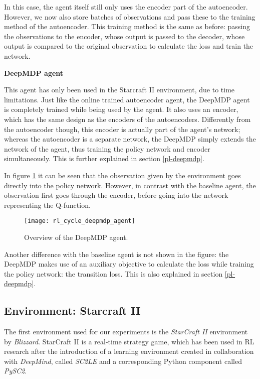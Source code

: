 In this case, the agent itself still only uses the encoder part of the autoencoder. However, we now also store batches of observations and pass these to the training method of the autoencoder. This training method is the same as before: passing the observations to the encoder, whose output is passed to the decoder, whose output is compared to the original observation to calculate the loss and train the network.\newline\par

\noindent \textbf{DeepMDP agent} \par
\noindent This agent has only been used in the Starcraft II environment, due to time limitations. Just like the online trained autoencoder agent, the DeepMDP agent is completely trained while being used by the agent. It also uses an encoder, which has the same design as the encoders of the autoencoders. Differently from the autoencoder though, this encoder is actually part of the agent's network; whereas the autoencoder is a separate network, the DeepMDP simply extends the network of the agent, thus training the policy network and encoder simultaneously. This is further explained in section \ref{pl-deepmdp}.

In figure \ref{fig:rl_cycle_deepmdp} it can be seen that the observation given by the environment goes directly into the policy network. However, in contrast with the baseline agent, the observation first goes through the encoder, before going into the network representing the Q-function.

\begin{figure}[h]
    \centering
    \texttt{[image: rl\_cycle\_deepmdp\_agent]}
    \caption{Overview of the DeepMDP agent.}
    \label{fig:rl_cycle_deepmdp}
\end{figure}

Another difference with the baseline agent is not shown in the figure: the DeepMDP makes use of an auxiliary objective to calculate the loss while training the policy network: the transition loss. This is also explained in section \ref{pl-deepmdp}.

\subsection{Environment: Starcraft II}\label{research-env-pysc2}
The first environment used for our experiments is the \emph{StarCraft II} environment by \emph{Blizzard}\cite{blizzard}. StarCraft II is a real-time strategy game, which has been used in RL research after the introduction of a learning environment created in collaboration with \emph{DeepMind}, called \emph{SC2LE} and a corresponding Python component called \emph{PySC2}\cite{pysc2}.

